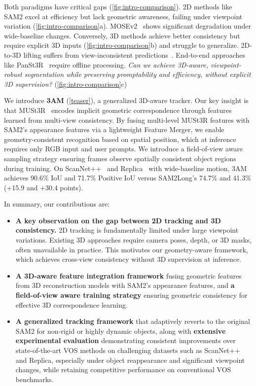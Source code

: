 Both paradigms have critical gaps (\cref{fig:intro-comparison}). 2D methods like SAM2 excel at efficiency but lack geometric awareness, failing under viewpoint variation (\cref{fig:intro-comparison}a). MOSEv2~\cite{ding2025mosev2} shows significant degradation under wide-baseline changes. Conversely, 3D methods achieve better consistency but require explicit 3D inputs (\cref{fig:intro-comparison}b) and struggle to generalize. 2D-to-3D lifting suffers from view-inconsistent predictions~\cite{jia2024sceneverse,peng2023openscene,takmaz2023openmask3d,xu2024embodiedsam,zhao2025sam2object}. End-to-end approaches like PanSt3R~\cite{zust2025panst3r} require offline processing. \emph{Can we achieve 3D-aware, viewpoint-robust segmentation while preserving promptability and efficiency, without explicit 3D supervision?} (\cref{fig:intro-comparison}c)

We introduce \textbf{3AM} (\cref{teaser}), a generalized 3D-aware tracker. Our key insight is that MUSt3R~\cite{cabon2025must3r} encodes implicit geometric correspondence through features learned from multi-view consistency. By fusing multi-level MUSt3R features with SAM2's appearance features via a lightweight Feature Merger, we enable geometry-consistent recognition based on spatial position, which at inference requires only RGB input and user prompts. We introduce a field-of-view aware sampling strategy ensuring frames observe spatially consistent object regions during training. On ScanNet++~\cite{yeshwanth2023scannet++} and Replica~\cite{replica19arxiv} with wide-baseline motion, 3AM achieves 90.6\% IoU and 71.7\% Positive IoU versus SAM2Long's 74.7\% and 41.3\% (+15.9 and +30.4 points).


In summary, our contributions are:
\begin{itemize}
\item \textbf{A key observation on the gap between 2D tracking and 3D consistency.}
2D tracking is fundamentally limited under large viewpoint variations. Existing 3D approaches require camera poses, depth, or 3D masks, often unavailable in practice. This motivates our geometry-aware framework, which achieves cross-view consistency without 3D supervision at inference.
\item \textbf{A 3D-aware feature integration framework} fusing geometric features from 3D reconstruction models with SAM2's appearance features, and \textbf{a field-of-view aware training strategy} ensuring geometric consistency for effective 3D correspondence learning.
\item \textbf{A generalized tracking framework} that adaptively reverts to the original SAM2 for non-rigid or highly dynamic objects, along with \textbf{extensive experimental evaluation} demonstrating consistent improvements over state-of-the-art VOS methods on challenging datasets such as ScanNet++ and Replica, especially under object reappearance and significant viewpoint changes, while retaining competitive performance on conventional VOS benchmarks.
\end{itemize}


